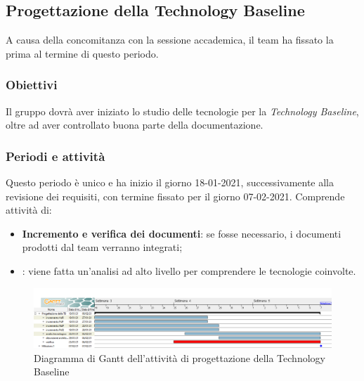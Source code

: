 \subsection{Progettazione della Technology Baseline}
A causa della concomitanza con la sessione accademica, il team ha fissato la prima  al termine di questo periodo. 
\subsubsection{Obiettivi}
Il gruppo dovrà aver iniziato lo studio delle tecnologie per la \textit{Technology Baseline}, oltre ad aver controllato buona parte della documentazione.
\subsubsection{Periodi e attività}
Questo periodo è unico e ha inizio il giorno 18-01-2021, successivamente alla revisione dei requisiti, con termine fissato per il giorno 07-02-2021. Comprende attività di: 
\begin{itemize}
\item \textbf{Incremento e verifica dei documenti}: se fosse necessario, i documenti prodotti dal team verranno integrati;
\item {}: viene fatta un'analisi ad alto livello per comprendere le tecnologie coinvolte.
\end{itemize}

\begin{figure}[h]
	\centering	
	\includegraphics[width=\linewidth]{Images/GanttPianificazioneProgettazioneTB.PNG}
	\caption{Diagramma di Gantt dell'attività di progettazione della Technology Baseline}
\end{figure}